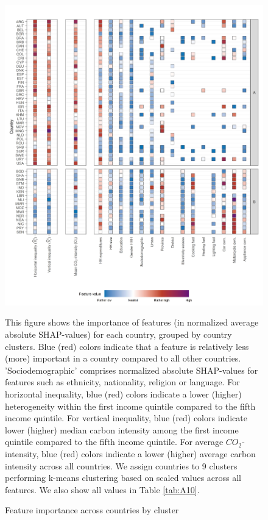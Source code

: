 \documentclass[12pt, a4paper]{article}
\newenvironment{subcaption}
{\strut
\vspace{-5pt}
\begin{minipage}[b]{0.9\textwidth}
  \hspace*{-\parindent}
  \footnotesize}
 {\end{minipage}}
\begin{document}
\begin{figure}[ht!]
    \centering
    \includegraphics{1_Figures/Figure 4/Figure_4_Corrected_1.jpg}
    \caption{Feature importance across countries by cluster}
    \label{fig:fig_4_1}
    \begin{subcaption}
    This figure shows the importance of features (in normalized average absolute SHAP-values) for each country, grouped by country clusters. Blue (red) colors indicate that a feature is relatively less (more) important in a country compared to all other countries. 'Sociodemographic' comprises normalized absolute SHAP-values for features such as ethnicity, nationality, religion or language.
    For horizontal inequality, blue (red) colors indicate a lower (higher) heterogeneity within the first income quintile compared to the fifth income quintile. For vertical inequality, blue (red) colors indicate lower (higher) median carbon intensity among the first income quintile compared to the fifth income quintile. For average $CO_{2}$-intensity, blue (red) colors indicate a lower (higher) average carbon intensity across all countries.
    We assign countries to 9 clusters performing k-means clustering based on scaled values across all features. We also show all values in Table \ref{tab:A10}.
    \end{subcaption}
\end{figure}
\end{document}
